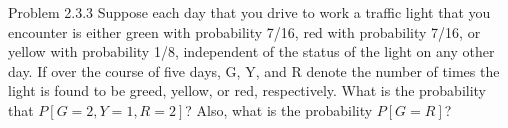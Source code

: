 \begin{problem}{Problem 2.3.3}
    Suppose each day that you drive to work a traffic light that you encounter is either green with probability 7/16, red with probability 7/16, or yellow with probability 1/8, independent of the status of the light on any other day. If over the course of five days, G, Y, and R denote the number of times the light is found to be greed, yellow, or red, respectively. What is the probability that $P[G=2, Y=1, R=2]$? Also, what is the probability $P[G=R]$?
\end{problem}